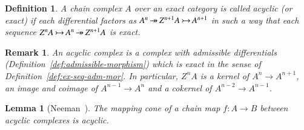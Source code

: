 \documentclass[1p]{elsarticle}
\theoremstyle{mythm}
\newtheorem{Lem}[Thm]{Lemma}
\theoremstyle{mydef}
\newtheorem{Rem}[Thm]{Remark}
\newtheorem{Def}[Thm]{Definition}
\begin{document}
\begin{Def}
  A chain complex $A$ over an exact category
  is called \emph{acyclic} (or \emph{exact}) if each differential
  factors as $A^{n} \operatorname{\twoheadrightarrow} Z^{n+1}A \operatorname{\rightarrowtail}  A^{n+1}$ in such a way 
  that each sequence
  $Z^{n}A \operatorname{\rightarrowtail} A^{n} \operatorname{\twoheadrightarrow} Z^{n+1}A$ is exact.
\end{Def}

\begin{Rem}
  An acyclic complex is a complex with admissible differentials
  (Definition~\ref{def:admissible-morphism}) which is exact in the
  sense of Definition~\ref{def:ex-seq-adm-mor}. In particular,
  $Z^{n}A$ is a kernel of $A^{n} \to A^{n+1}$, an image and coimage
  of $A^{n-1} \to A^{n}$ and a cokernel of $A^{n-2} \to A^{n-1}$. 
\end{Rem}


\begin{Lem}[{Neeman~\cite[1.1]{MR1080854}}]
  \label{lem:cone-of-acyclics-is-acyclic}
  The mapping cone of a chain map $f: A \to B$ between acyclic
  complexes is acyclic.
\end{Lem}
\end{document}
